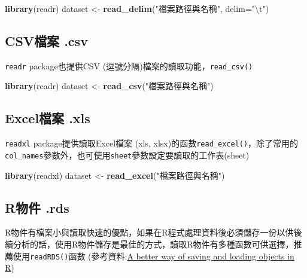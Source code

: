 \documentclass[]{book}
\newenvironment{Shaded}{\begin{snugshade}}{\end{snugshade}}
\newcommand{\KeywordTok}[1]{\textcolor[rgb]{0.13,0.29,0.53}{\textbf{{#1}}}}
\newcommand{\DataTypeTok}[1]{\textcolor[rgb]{0.13,0.29,0.53}{{#1}}}
\newcommand{\CharTok}[1]{\textcolor[rgb]{0.31,0.60,0.02}{{#1}}}
\newcommand{\StringTok}[1]{\textcolor[rgb]{0.31,0.60,0.02}{{#1}}}
\newcommand{\NormalTok}[1]{{#1}}
\theoremstyle{definition}
\theoremstyle{definition}
\theoremstyle{remark}
\begin{document}
\begin{Shaded}
\begin{Highlighting}[]
\KeywordTok{library}\NormalTok{(readr)}
\NormalTok{dataset <-}\StringTok{ }\KeywordTok{read_delim}\NormalTok{(}\StringTok{"檔案路徑與名稱"}\NormalTok{, }\DataTypeTok{delim=}\StringTok{"}\CharTok{\textbackslash{}t}\StringTok{"}\NormalTok{)}
\end{Highlighting}
\end{Shaded}

\subsection{CSV檔案 .csv}\label{csv}

\texttt{readr} \citep{R-readr} package也提供CSV
(逗號分隔)檔案的讀取功能，\texttt{read\_csv()}

\begin{Shaded}
\begin{Highlighting}[]
\KeywordTok{library}\NormalTok{(readr)}
\NormalTok{dataset <-}\StringTok{ }\KeywordTok{read_csv}\NormalTok{(}\StringTok{"檔案路徑與名稱"}\NormalTok{)}
\end{Highlighting}
\end{Shaded}

\subsection{Excel檔案 .xls}\label{excel-.xls}

\texttt{readxl} \citep{R-readxl} package提供讀取Excel檔案 (xls,
xlsx)的函數\texttt{read\_excel()}，除了常用的\texttt{col\_names}參數外，也可使用\texttt{sheet}參數設定要讀取的工作表(sheet)

\begin{Shaded}
\begin{Highlighting}[]
\KeywordTok{library}\NormalTok{(readxl)}
\NormalTok{dataset <-}\StringTok{ }\KeywordTok{read_excel}\NormalTok{(}\StringTok{"檔案路徑與名稱"}\NormalTok{)}
\end{Highlighting}
\end{Shaded}

\subsection{R物件 .rds}\label{r-.rds}

R物件有檔案小與讀取快速的優點，如果在R程式處理資料後必須儲存一份以供後續分析的話，使用R物件儲存是最佳的方式，讀取R物件有多種函數可供選擇，推薦使用\texttt{readRDS()}函數
(參考資料:\href{http://www.fromthebottomoftheheap.net/2012/04/01/saving-and-loading-r-objects/}{A
better way of saving and loading objects in R})
\end{document}
